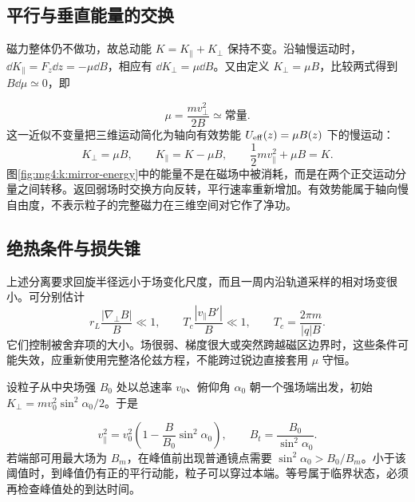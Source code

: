 \subsection{平行与垂直能量的交换}
磁力整体仍不做功，故总动能 $K=K_\parallel+K_\perp$ 保持不变。沿轴慢运动时，$\dd K_\parallel=F_z\dd z=-\mu\dd B$，相应有 $\dd K_\perp=\mu\dd B$。又由定义 $K_\perp=\mu B$，比较两式得到 $B\dd\mu\simeq0$，即

\begin{equation}\mu=\frac{mv_\perp^2}{2B}\simeq\text{常量}.\end{equation}
这一近似不变量把三维运动简化为轴向有效势能 $U_{\rm eff}(z)=\mu B(z)$ 下的慢运动：
\[
 K_\perp=\mu B,\qquad K_\parallel=K-\mu B,\qquad
 \frac12mv_\parallel^2+\mu B=K.
\]
图\ref{fig:mg4:k:mirror-energy}中的能量不是在磁场中被消耗，而是在两个正交运动分量之间转移。返回弱场时交换方向反转，平行速率重新增加。有效势能属于轴向慢自由度，不表示粒子的完整磁力在三维空间对它作了净功。


\subsection{绝热条件与损失锥}
上述分离要求回旋半径远小于场变化尺度，而且一周内沿轨道采样的相对场变很小。可分别估计
\[
 r_L\frac{|\nabla_\perp B|}{B}\ll1,\qquad
 T_c\frac{|v_\parallel B'|}{B}\ll1,
 \qquad T_c=\frac{2\pi m}{|q|B}.
\]
它们控制被舍弃项的大小。场很弱、梯度很大或突然跨越磁区边界时，这些条件可能失效，应重新使用完整洛伦兹方程，不能跨过锐边直接套用 $\mu$ 守恒。


设粒子从中央场强 $B_0$ 处以总速率 $v_0$、俯仰角 $\alpha_0$ 朝一个强场端出发，初始 $K_\perp=mv_0^2\sin^2\alpha_0/2$。于是

\[
 v_\parallel^2=v_0^2\left(1-\frac{B}{B_0}\sin^2\alpha_0\right),\qquad
 B_t=\frac{B_0}{\sin^2\alpha_0}.
\]
若端部可用最大场为 $B_m$，在峰值前出现普通镜点需要 $\sin^2\alpha_0>B_0/B_m$。小于该阈值时，到峰值仍有正的平行动能，粒子可以穿过本端。等号属于临界状态，必须再检查峰值处的到达时间。

